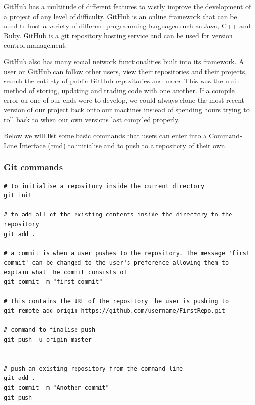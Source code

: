 GitHub has a multitude of different features to vastly improve the development of a project of any level of difficulty. GitHub is an online framework that can be used to host a variety of different programming languages such as Java, C++ and Ruby. GitHub is a git repository hosting service and can be used for version control management. \par
GitHub also has many social network functionalities built into its framework. A user on GitHub can follow other users, view their repositories and their projects, search the entirety of public GitHub repositories and more. This was the main method of storing, updating and trading code with one another. If a compile error on one of our ends were to develop, we could always clone the most recent version of our project back onto our machines instead of spending hours trying to roll back to when our own versions last compiled properly. \par
Below we will list some basic commands that users can enter into a Command-Line Interface (cmd) to initialise and to push to a repository of their own.

\subsubsection{Git commands}
\begin{verbatim}
# to initialise a repository inside the current directory
git init

# to add all of the existing contents inside the directory to the repository
git add .

# a commit is when a user pushes to the repository. The message "first commit" can be changed to the user's preference allowing them to explain what the commit consists of
git commit -m "first commit"

# this contains the URL of the repository the user is pushing to
git remote add origin https://github.com/username/FirstRepo.git 

# command to finalise push
git push -u origin master


# push an existing repository from the command line
git add .
git commit -m "Another commit"
git push

\end{verbatim}

